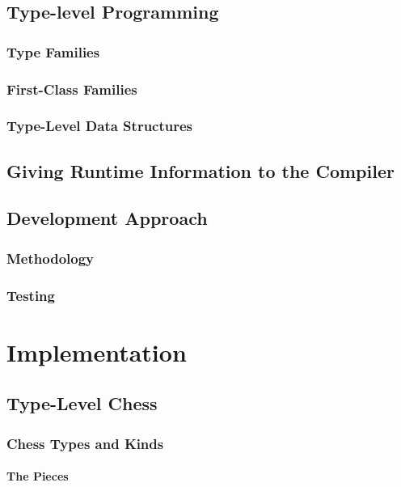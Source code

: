 \documentclass[12pt, a4paper, bibliography=totocnumbered]{scrreprt}
\begin{document}
\chapter{Type-level Programming}

\section{Type Families}

\section{First-Class Families}

\section{Type-Level Data Structures}

\chapter{Giving Runtime Information to the Compiler}

\chapter{Development Approach}

\section{Methodology}

\section{Testing}


\part{Implementation}

\chapter{Type-Level Chess}

\section{Chess Types and Kinds}

\subsection{The Pieces}
\end{document}
